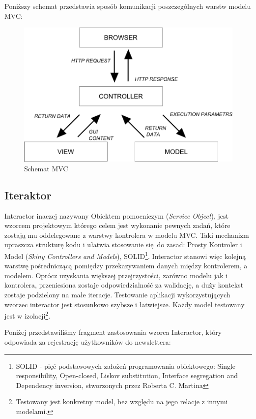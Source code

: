     Poniższy schemat przedstawia sposób komunikacji poszczególnych warstw modelu MVC:
    \begin{figure}[h]
      \centering
      \includegraphics[scale=0.87]{images/mvc_model.png}
      \caption{Schemat MVC}
    \end{figure}
  \subsection{Iteraktor}
  Interactor\cite{interactors} inaczej nazywany Obiektem pomocniczym (\emph{Service Object}), jest wzorcem projektowym którego celem jest
  wykonanie pewnych zadań, które zostają mu oddelegowane z warstwy kontrolera w modelu MVC. Taki mechanizm upraszcza strukturę kodu i ułatwia stosowanie się do zasad: Prosty Kontroler i Model (\emph{Skiny Controllers and Models}), SOLID\footnote{SOLID - pięć podstawowych założeń programowania obiektowego: Single responsibility, Open-closed, Liskov substitution, Interface segregation and Dependency inversion,  stworzonych przez Roberta C. Martina}.
  Interactor stanowi więc kolejną warstwę pośredniczącą pomiędzy przekazywaniem danych między kontrolerem, a modelem. Oprócz uzyskania większej przejrzystości, zarówno modelu jak i kontrolera, przeniesiona zostaje odpowiedzialność za walidację, a duży kontekst zostaje podzielony na małe iteracje. Testowanie aplikacji wykorzystujących wzorzec interactor jest stosunkowo szybsze i łatwiejsze. Każdy model testowany jest w izolacji\footnote{Testowany jest konkretny model, bez względu na jego relacje z innymi modelami.}.

  Poniżej przedstawiliśmy fragment zastosowania wzorca Interactor, który odpowiada za rejestrację użytkowników do newslettera:\\
  
